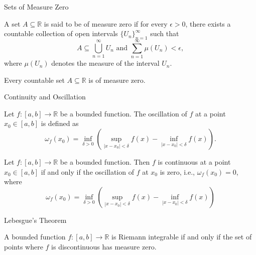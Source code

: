 \documentclass[12pt,a4paper]{article}
\begin{document}
\FrontPage
\Large


\begin{heading}
    Sets of Measure Zero
\end{heading}

\clearpage

\begin{theorem}
    A set $A \subseteq \mathbb{R}$ is said to be of measure zero if for every $\epsilon > 0$, there exists a countable collection of open intervals $\{U_n\}_{n=1}^{\infty}$ such that
    \[A \subseteq \bigcup_{n=1}^{\infty} U_n \text{ and }\sum_{n=1}^{\infty} \mu(U_n) < \epsilon,\] where $\mu(U_n)$ denotes the measure of the interval $U_n$.
\end{theorem}

\clearpage

\begin{theorem}
    Every countable set $A \subseteq \mathbb{R}$ is of measure zero.
\end{theorem}

\clearpage

\begin{heading}
    Continuity and Oscillation
\end{heading}

\begin{definition}
    Let $f: [a, b] \to \mathbb{R}$ be a bounded function. The oscillation of $f$ at a point $x_0 \in [a, b]$ is defined as
    \[
    \omega_f(x_0)
    =
    \inf_{\delta>0}
    \left(
    \sup_{|x-x_0|<\delta} f(x)
    -
    \inf_{|x-x_0|<\delta} f(x)
    \right).
    \]
    
\end{definition}

\clearpage

\begin{theorem}
    Let $f: [a, b] \to \mathbb{R}$ be a bounded function. Then $f$ is continuous at a point $x_0 \in [a, b]$ if and only if the oscillation of $f$ at $x_0$ is zero, i.e., $\omega_f(x_0) = 0$, where \[
    \omega_f(x_0)
    =
    \inf_{\delta>0}
    \left(
    \sup_{|x-x_0|<\delta} f(x)
    -
    \inf_{|x-x_0|<\delta} f(x)
    \right)
    \]

    \end{theorem}


\clearpage

\begin{heading}
    Lebesgue’s Theorem
\end{heading}

\vspace{10pt}

\begin{theorem}
    A bounded function $f: [a, b] \to \mathbb{R}$ is Riemann integrable if and only if the set of points where $f$ is discontinuous has measure zero.
\end{theorem}

\EndPage
\end{document}
